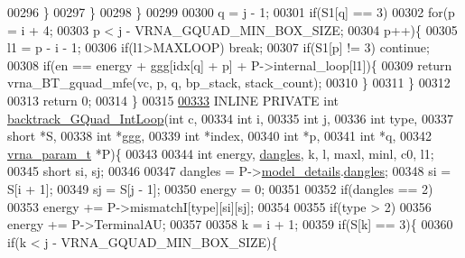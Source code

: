 \begin{DoxyCode}
00296       \}
00297     \}
00298   \}
00299 
00300   q = j - 1;
00301   \textcolor{keywordflow}{if}(S1[q] == 3)
00302     \textcolor{keywordflow}{for}(p = i + 4;
00303         p < j - VRNA\_GQUAD\_MIN\_BOX\_SIZE;
00304         p++)\{
00305       l1    = p - i - 1;
00306       \textcolor{keywordflow}{if}(l1>MAXLOOP) \textcolor{keywordflow}{break};
00307       \textcolor{keywordflow}{if}(S1[p] != 3) \textcolor{keywordflow}{continue};
00308       \textcolor{keywordflow}{if}(en == energy + ggg[idx[q] + p] + P->internal\_loop[l1])\{
00309         \textcolor{keywordflow}{return} vrna\_BT\_gquad\_mfe(vc, p, q, bp\_stack, stack\_count);
00310       \}
00311     \}
00312 
00313   \textcolor{keywordflow}{return} 0;
00314 \}
00315 
\hypertarget{gquad_8h_source_l00333}{}\hyperlink{group__loops_ga220c41e8dbcee940ac975b8ce88e55c5}{00333} INLINE  PRIVATE \textcolor{keywordtype}{int} \hyperlink{group__loops_ga220c41e8dbcee940ac975b8ce88e55c5}{backtrack\_GQuad\_IntLoop}(\textcolor{keywordtype}{int} c,
00334                                             \textcolor{keywordtype}{int} i,
00335                                             \textcolor{keywordtype}{int} j,
00336                                             \textcolor{keywordtype}{int} type,
00337                                             \textcolor{keywordtype}{short} *S,
00338                                             \textcolor{keywordtype}{int} *ggg,
00339                                             \textcolor{keywordtype}{int} *index,
00340                                             \textcolor{keywordtype}{int} *p,
00341                                             \textcolor{keywordtype}{int} *q,
00342                                             \hyperlink{group__energy__parameters_structvrna__param__s}{vrna\_param\_t} *P)\{
00343 
00344   \textcolor{keywordtype}{int} energy, \hyperlink{group__model__details_ga72b511ed1201f7e23ec437e468790d74}{dangles}, k, l, maxl, minl, c0, l1;
00345   \textcolor{keywordtype}{short} si, sj;
00346 
00347   dangles = P->\hyperlink{group__energy__parameters_a7b84353eb9075c595bad4ceb871bcae7}{model\_details}.\hyperlink{group__model__details_adcda4ff2ea77748ae0e8700288282efc}{dangles};
00348   si      = S[i + 1];
00349   sj      = S[j - 1];
00350   energy  = 0;
00351 
00352   \textcolor{keywordflow}{if}(dangles == 2)
00353     energy += P->mismatchI[type][si][sj];
00354 
00355   \textcolor{keywordflow}{if}(type > 2)
00356     energy += P->TerminalAU;
00357 
00358   k = i + 1;
00359   \textcolor{keywordflow}{if}(S[k] == 3)\{
00360     \textcolor{keywordflow}{if}(k < j - VRNA\_GQUAD\_MIN\_BOX\_SIZE)\{

\end{DoxyCode}
